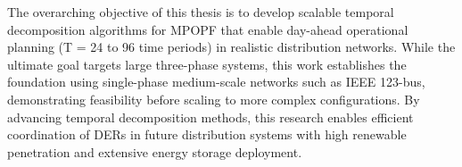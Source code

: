The overarching objective of this thesis is to develop scalable temporal decomposition algorithms for MPOPF that enable day-ahead operational planning (T = 24 to 96 time periods) in realistic distribution networks. While the ultimate goal targets large three-phase systems, this work establishes the foundation using single-phase medium-scale networks such as IEEE 123-bus, demonstrating feasibility before scaling to more complex configurations. By advancing temporal decomposition methods, this research enables efficient coordination of DERs in future distribution systems with high renewable penetration and extensive energy storage deployment.
